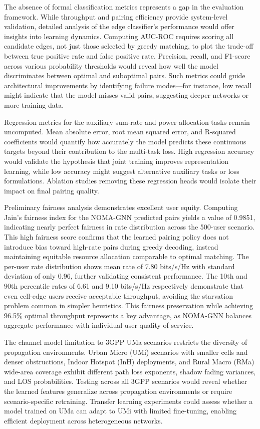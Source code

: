 The absence of formal classification metrics represents a gap in the evaluation framework. While throughput and pairing efficiency provide system-level validation, detailed analysis of the edge classifier's performance would offer insights into learning dynamics. Computing AUC-ROC requires scoring all candidate edges, not just those selected by greedy matching, to plot the trade-off between true positive rate and false positive rate. Precision, recall, and F1-score across various probability thresholds would reveal how well the model discriminates between optimal and suboptimal pairs. Such metrics could guide architectural improvements by identifying failure modes—for instance, low recall might indicate that the model misses valid pairs, suggesting deeper networks or more training data.

Regression metrics for the auxiliary sum-rate and power allocation tasks remain uncomputed. Mean absolute error, root mean squared error, and R-squared coefficients would quantify how accurately the model predicts these continuous targets beyond their contribution to the multi-task loss. High regression accuracy would validate the hypothesis that joint training improves representation learning, while low accuracy might suggest alternative auxiliary tasks or loss formulations. Ablation studies removing these regression heads would isolate their impact on final pairing quality.

Preliminary fairness analysis demonstrates excellent user equity. Computing Jain's fairness index for the NOMA-GNN predicted pairs yields a value of 0.9851, indicating nearly perfect fairness in rate distribution across the 500-user scenario. This high fairness score confirms that the learned pairing policy does not introduce bias toward high-rate pairs during greedy decoding, instead maintaining equitable resource allocation comparable to optimal matching. The per-user rate distribution shows mean rate of 7.80 bits/s/Hz with standard deviation of only 0.96, further validating consistent performance. The 10th and 90th percentile rates of 6.61 and 9.10 bits/s/Hz respectively demonstrate that even cell-edge users receive acceptable throughput, avoiding the starvation problem common in simpler heuristics. This fairness preservation while achieving 96.5\% optimal throughput represents a key advantage, as NOMA-GNN balances aggregate performance with individual user quality of service.

The channel model limitation to 3GPP UMa scenarios restricts the diversity of propagation environments. Urban Micro (UMi) scenarios with smaller cells and denser obstructions, Indoor Hotspot (InH) deployments, and Rural Macro (RMa) wide-area coverage exhibit different path loss exponents, shadow fading variances, and LOS probabilities. Testing across all 3GPP scenarios would reveal whether the learned features generalize across propagation environments or require scenario-specific retraining. Transfer learning experiments could assess whether a model trained on UMa can adapt to UMi with limited fine-tuning, enabling efficient deployment across heterogeneous networks.

